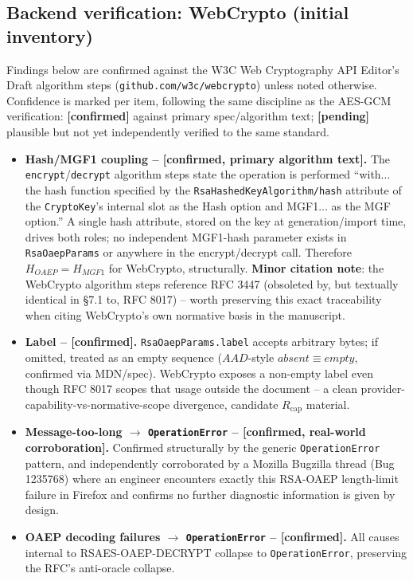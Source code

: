 \documentclass[11pt,a4paper]{article}
\begin{document}
\subsection{Backend verification: WebCrypto (initial inventory)}
Findings below are confirmed against the W3C Web Cryptography API Editor's Draft algorithm steps (\texttt{github.com/w3c/webcrypto}) unless noted otherwise. Confidence is marked per item, following the same discipline as the AES-GCM verification: \textbf{[confirmed]} against primary spec/algorithm text; \textbf{[pending]} plausible but not yet independently verified to the same standard.

\begin{itemize}
\item \textbf{Hash/MGF1 coupling -- [confirmed, primary algorithm text].} The \texttt{encrypt}/\texttt{decrypt} algorithm steps state the operation is performed ``with... the hash function specified by the \texttt{RsaHashedKeyAlgorithm/hash} attribute of the \texttt{CryptoKey}'s internal slot as the Hash option and MGF1... as the MGF option.'' A single hash attribute, stored on the key at generation/import time, drives both roles; no independent MGF1-hash parameter exists in \texttt{RsaOaepParams} or anywhere in the encrypt/decrypt call. Therefore $H_{OAEP} = H_{MGF1}$ for WebCrypto, structurally. \textbf{Minor citation note}: the WebCrypto algorithm steps reference RFC 3447 (obsoleted by, but textually identical in \S7.1 to, RFC 8017) -- worth preserving this exact traceability when citing WebCrypto's own normative basis in the manuscript.
\item \textbf{Label -- [confirmed].} \texttt{RsaOaepParams.label} accepts arbitrary bytes; if omitted, treated as an empty sequence ($AAD$-style $absent \equiv empty$, confirmed via MDN/spec). WebCrypto exposes a non-empty label even though RFC 8017 scopes that usage outside the document -- a clean provider-capability-vs-normative-scope divergence, candidate $R_{\text{cap}}$ material.
\item \textbf{Message-too-long $\to$ \texttt{OperationError} -- [confirmed, real-world corroboration].} Confirmed structurally by the generic \texttt{OperationError} pattern, and independently corroborated by a Mozilla Bugzilla thread (Bug 1235768) where an engineer encounters exactly this RSA-OAEP length-limit failure in Firefox and confirms no further diagnostic information is given by design.
\item \textbf{OAEP decoding failures $\to$ \texttt{OperationError} -- [confirmed].} All causes internal to RSAES-OAEP-DECRYPT collapse to \texttt{OperationError}, preserving the RFC's anti-oracle collapse.

\end{itemize}
\end{document}
